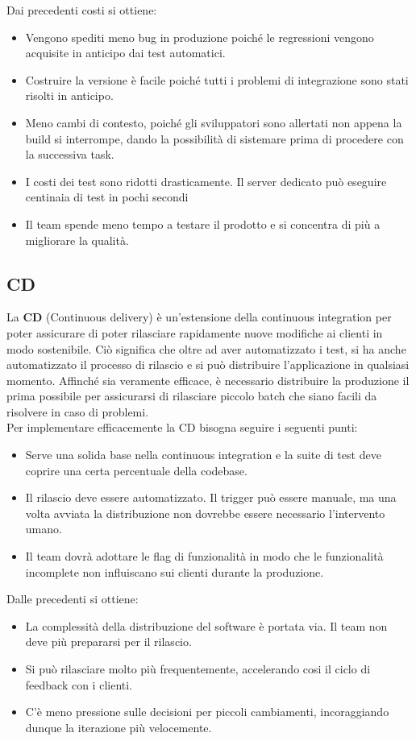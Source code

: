 Dai precedenti costi si ottiene: 
\begin{itemize}
	\item Vengono spediti meno bug in produzione poiché le regressioni vengono acquisite in anticipo dai test automatici. 
	\item Costruire la versione è facile poiché tutti i problemi di integrazione sono stati risolti in anticipo. 
	\item Meno cambi di contesto, poiché gli sviluppatori sono allertati non appena la build si interrompe, dando la possibilità di sistemare prima di procedere con la successiva task. 
	\item I costi dei test sono ridotti drasticamente. Il server dedicato può eseguire centinaia di test in pochi secondi 
	\item Il team spende meno tempo a testare il prodotto e si concentra di più a migliorare la qualità.
\end{itemize}


\subsection{CD}
La \textbf{CD} (Continuous delivery) è un'estensione della continuous integration per poter assicurare di poter rilasciare rapidamente nuove modifiche ai clienti in modo sostenibile. Ciò significa che oltre ad aver automatizzato i test, si ha anche automatizzato il processo di rilascio e si può distribuire l'applicazione in qualsiasi momento. 
Affinché sia veramente efficace, è necessario distribuire la produzione il prima possibile per assicurarsi di rilasciare piccolo batch che siano facili da risolvere in caso di problemi. \\
Per implementare efficacemente la CD bisogna seguire i seguenti punti: 
\begin{itemize}
	\item Serve una solida base nella continuous integration e la suite di test deve coprire una certa percentuale della codebase. 
	\item Il rilascio deve essere automatizzato. Il trigger può essere manuale, ma una volta avviata la distribuzione non dovrebbe essere necessario l'intervento umano. 
	\item Il team dovrà adottare le flag di funzionalità in modo che le funzionalità incomplete non influiscano sui clienti durante la produzione. 
\end{itemize}

Dalle precedenti si ottiene: 
\begin{itemize}
\item La complessità della distribuzione del software è portata via. Il team non deve più prepararsi per il rilascio. 
\item Si può rilasciare molto più frequentemente, accelerando cosi il ciclo di feedback con i clienti. 
\item C'è meno pressione sulle decisioni per piccoli cambiamenti, incoraggiando dunque la iterazione più velocemente. 
\end{itemize}



